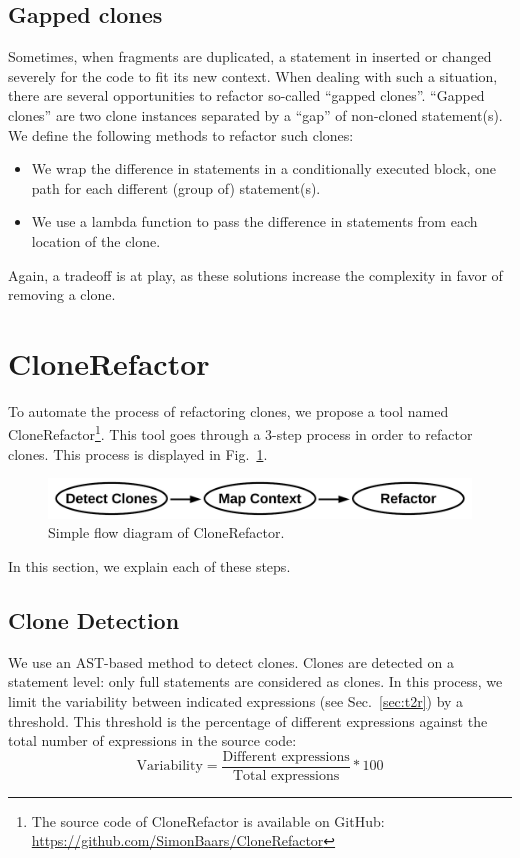 \documentclass[sigconf,review]{acmart}
\begin{document}
\subsection{Gapped clones} \label{sec:t3r}
Sometimes, when fragments are duplicated, a statement in inserted or changed severely for the code to fit its new context. When dealing with such a situation, there are several opportunities to refactor so-called ``gapped clones''. ``Gapped clones'' are two clone instances separated by a ``gap'' of non-cloned statement(s). We define the following methods to refactor such clones:
\begin{itemize}
  \item We wrap the difference in statements in a conditionally executed block, one path for each different (group of) statement(s).
  \item We use a lambda function to pass the difference in statements from each location of the clone.
\end{itemize}
Again, a tradeoff is at play, as these solutions increase the complexity in favor of removing a clone.

\section{CloneRefactor}
To automate the process of refactoring clones, we propose a tool named CloneRefactor\footnote{The source code of CloneRefactor is available on GitHub: \url{https://github.com/SimonBaars/CloneRefactor}}. This tool goes through a 3-step process in order to refactor clones. This process is displayed in Fig.~\ref{fig:clonerefactorflow}.
\begin{figure}[H]
  \includegraphics[width=1\columnwidth]{img/flow}
  \caption{Simple flow diagram of CloneRefactor.}
  \label{fig:clonerefactorflow}
\end{figure}
In this section, we explain each of these steps.


\subsection{Clone Detection}
We use an AST-based method to detect clones. Clones are detected on a statement level: only full statements are considered as clones. In this process, we limit the variability between indicated expressions (see Sec.~\ref{sec:t2r}) by a threshold. This threshold is the percentage of different expressions against the total number of expressions in the source code:
\begin{equation}\label{eq:type2r}
\text{Variability}=\frac{\text{Different expressions}}{\text{Total expressions}}*100
\end{equation}
\end{document}
